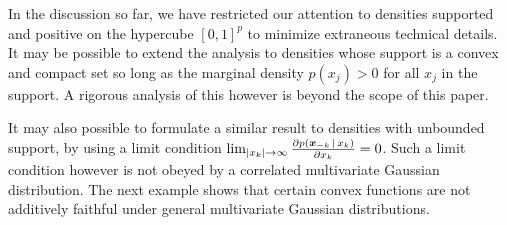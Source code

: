 
In the discussion so far, we have restricted our attention to
densities supported and positive on the hypercube $[0,1]^p$ to
minimize extraneous technical details. It may be possible to extend
the analysis to densities whose support is a convex and compact set so
long as the marginal density $p(x_j) > 0$ for all $x_j$ in the
support. A rigorous analysis of this however is beyond the scope of
this paper.

It may also possible to formulate a similar result to densities with
unbounded support, by using a limit condition $\lim_{|x_k| \rightarrow
  \infty} \frac{\partial p(\mbox{\boldmath $\scriptstyle x$}_{-k} {\,|\,}
  x_k)}{\partial x_k} = 0$.  Such a limit condition however is not
obeyed by a correlated multivariate Gaussian distribution.  The next
example shows that certain convex functions are not additively
faithful under general multivariate Gaussian distributions.


